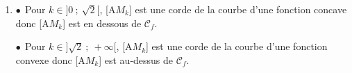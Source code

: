 \documentclass[10pt]{article}
\begin{document}
\begin{enumerate}
\begin{enumerate}
Le trinôme, donc $f''(x)$ est positif sauf sur l'intervalle $\left]-\sqrt 2~;~\sqrt{2}\right[$ ou ici puisque $x > 0, \: f''(x)$ est positif sauf sur l'intervalle $\left]0~;~\sqrt{2}\right[$. Conclusion :

$\bullet~~$ Sur l'intervalle $\left]0~;~\sqrt 2\right]$, $f''(x) < 0$, la fonction $f$ est concave ;

$\bullet~~$ Sur l'intervalle $\left]\sqrt 2~;~+ \infty\right]$, $f''(x) > 0$, la fonction $f$ est convexe ;

$\bullet~~$$f''\left(\sqrt 2\right) = 0$ : le point d'abscisse $\sqrt 2$, donc d'ordonnée $f\left( \right) = 2 - 6\sqrt 2 + 4 \ln \sqrt 2 = 2 - 6\sqrt 2 + 4 \times \dfrac12\ln 2 = 2 - 6\sqrt 2 + 2\ln 2$ est le point d'inflexion de $\mathcal{C}_f$, car en ce point la dérivée seconde s'annule en changeant de signe.
		\item 
		



$\bullet~~$Pour $k \in  ]0~;~\sqrt 2[$, [A$M_k]$ est une corde de la courbe d'une fonction concave donc [A$M_k$] est en dessous de $\mathcal{C}_f$.

$\bullet~~$Pour $k \in ]\sqrt 2~;~ +\infty[$, [A$M_k$] est une corde de la courbe d'une fonction convexe donc [A$M_k$] est au-dessus de $\mathcal{C}_f$.
	\end{enumerate}
\end{enumerate}

\bigskip
\end{document}
